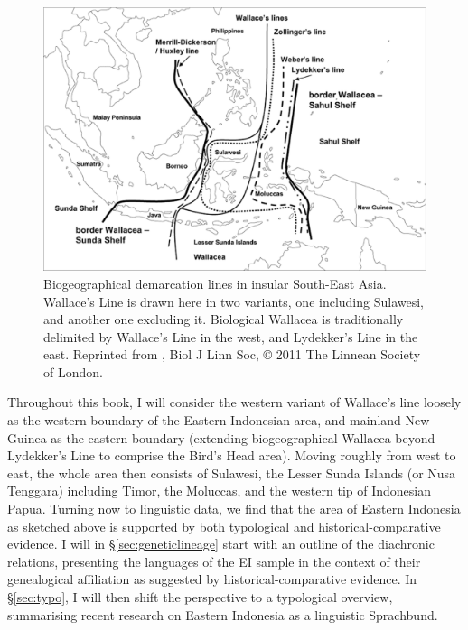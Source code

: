 \begin{figure}

\includegraphics[width=1.0\textwidth]{figures/Wallacea2.eps}
\caption[Biogeographical demarcation lines in insular South-East Asia]{Biogeographical demarcation lines in insular South-East Asia. Wallace's Line is drawn here in two variants, one including Sulawesi, and another one excluding it. Biological Wallacea is traditionally delimited by Wallace's Line in the west, and Lydekker's Line in the east. Reprinted from \citealt{Welzen2011}, Biol J Linn Soc, © 2011 The Linnean Society of London.}\label{map:wallacea}

\end{figure}

Throughout this book, I will consider the western variant of Wallace's line loosely as the western boundary of the Eastern Indonesian area, and mainland New Guinea as the eastern boundary (extending biogeographical Wallacea beyond Lydekker's Line to comprise the Bird's Head area). Moving roughly from west to east, the whole area then consists of Sulawesi, the Lesser Sunda Islands (or Nusa Tenggara) including Timor, the Moluccas, and the western tip of Indonesian Papua. Turning now to linguistic data, we find that the area of Eastern Indonesia as sketched above is supported by both typological and historical-comparative evidence. I will in §\ref{sec:geneticlineage} start with an outline of the diachronic relations, presenting the languages of the EI sample in the context of their genealogical affiliation as suggested by historical-comparative evidence. In §\ref{sec:typo}, I will then shift the perspective to a typological overview, summarising recent research on Eastern Indonesia as a linguistic Sprachbund. 

